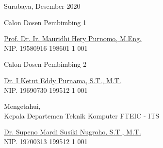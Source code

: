 \begin{flushright}
  Surabaya, Desember 2020
\end{flushright}
\vspace{1ex}

\begin{center}

  \begin{multicols}{2}

    Calon Dosen Pembimbing 1
    \vspace{12ex}

    \underline{Prof. Dr. Ir. Mauridhi Hery Purnomo, M.Eng.} \\
    NIP. 19580916 198601 1 001

    \columnbreak

    Calon Dosen Pembimbing 2
    \vspace{12ex}

    \underline{Dr. I Ketut Eddy Purnama, S.T., M.T.} \\
    NIP. 19690730 199512 1 001

  \end{multicols}
  \vspace{6ex}

  Mengetahui, \\
  Kepala Departemen Teknik Komputer FTEIC - ITS
  \vspace{12ex}

  \underline{Dr. Supeno Mardi Susiki Nugroho, S.T., M.T.} \\
  NIP. 19700313 199512 1 001

\end{center}
